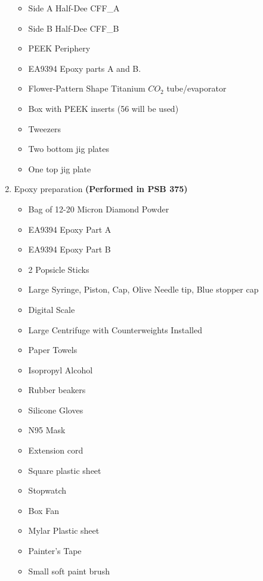 \documentclass[12pt]{cornelltfpxsop}
\begin{document}
\begin{enumerate}
    \begin{itemize}
        \item Side A Half-Dee CFF\_A 
        \item Side B Half-Dee CFF\_B
        \item PEEK Periphery
        \item EA9394 Epoxy  parts A and B. 
        \item Flower-Pattern Shape Titanium $CO_2$ tube/evaporator
        \item Box with PEEK inserts (56 will be used)
        \item Tweezers
        \item Two bottom jig plates
        \item One top jig plate
    \end{itemize}
\item Epoxy preparation \textbf{(Performed in PSB 375)}
    \begin{itemize}
        \item Bag of 12-20 Micron Diamond Powder
        \item EA9394 Epoxy Part A
        \item EA9394 Epoxy Part B
        \item 2 Popsicle Sticks
        \item Large Syringe, Piston, Cap, Olive Needle tip, Blue stopper cap
        \item Digital Scale
        \item Large Centrifuge with Counterweights Installed
        \item Paper Towels
        \item Isopropyl Alcohol
        \item Rubber beakers
        \item Silicone Gloves
        \item N95 Mask
        \item Extension cord
        \item Square plastic sheet
        \item Stopwatch
        \item Box Fan
        \item Mylar Plastic sheet
        \item Painter's Tape
        \item Small soft paint brush
    \end{itemize}
\end{enumerate}
\end{document}
